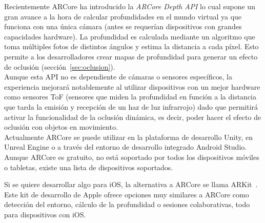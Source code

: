 
Recientemente ARCore ha introducido la \textit{ARCore Depth API} lo cual supone un gran avance a la hora de calcular profundidades en el mundo virtual ya que funciona con una única cámara (antes se requerían dispositivos con grandes capacidades hardware). La profundidad es calculada mediante un algoritmo que toma múltiples fotos de distintos ángulos y estima la distancia a cada píxel. Esto permite a los desarrolladores crear mapas de profundidad para generar un efecto de oclusión (sección~\ref{sec:oclusion}).\\

Aunque esta API no es dependiente de cámaras o sensores específicos, la experiencia mejorará notablemente al utilizar dispositivos con un mejor hardware como sensores ToF (sensores que miden la profundidad en función a la distancia que tarda la emisión y recepción de un haz de luz infrarrojo) dado que permitirá activar la funcionalidad de la oclusión dinámica, es decir, poder hacer el efecto de oclusión con objetos en movimiento.\\

Actualmente ARCore se puede utilizar en la plataforma de desarrollo Unity, en Unreal Engine o a través del entorno de desarrollo integrado Android Studio. Aunque ARCore es gratuito, no está soportado por todos los dispositivos móviles o tabletas, existe una lista de dispositivos soportados\footnotemark.\\


Si se quiere desarrollar algo para iOS, la alternativa a ARCore se llama ARKit~\cite{arKitIntro}. Este kit de desarrollo de Apple ofrece opciones muy similares a ARCore como detección del entorno, cálculo de la profundidad o sesiones colaborativas, todo para dispositivos con iOS.




